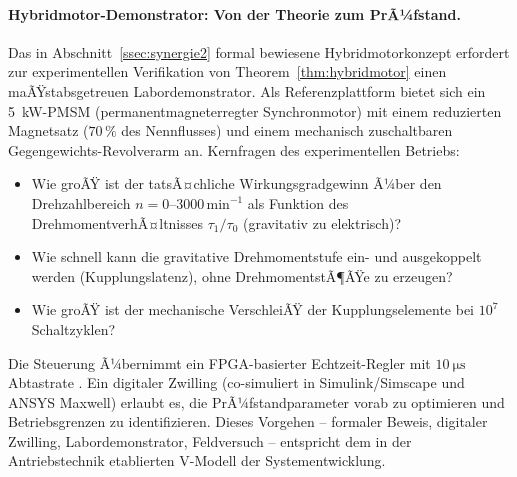 ﻿\documentclass[12pt, a4paper]{report}
\theoremstyle{definition}
\theoremstyle{remark}
\begin{document}
\paragraph{Hybridmotor-Demonstrator: Von der Theorie zum PrÃ¼fstand.}
Das in Abschnitt~\ref{ssec:synergie2} formal bewiesene Hybridmotorkonzept
erfordert zur experimentellen Verifikation von Theorem~\ref{thm:hybridmotor}
einen maÃŸstabsgetreuen Labordemonstrator. Als Referenzplattform bietet sich ein
\SI{5}{\kilo\watt}-PMSM (permanentmagneterregter Synchronmotor) mit einem
reduzierten Magnetsatz ($70\,\%$ des Nennflusses) und einem mechanisch
zuschaltbaren Gegengewichts-Revolverarm an. Kernfragen des experimentellen
Betriebs:
\begin{itemize}
  \item Wie groÃŸ ist der tatsÃ¤chliche Wirkungsgradgewinn Ã¼ber den Drehzahlbereich
        $n = 0$--$3000\,\text{min}^{-1}$ als Funktion des DrehmomentverhÃ¤ltnisses
        $\tau_1 / \tau_0$ (gravitativ zu elektrisch)?
  \item Wie schnell kann die gravitative Drehmomentstufe ein- und ausgekoppelt
        werden (Kupplungslatenz), ohne DrehmomentstÃ¶ÃŸe zu erzeugen?
  \item Wie groÃŸ ist der mechanische VerschleiÃŸ der Kupplungselemente bei
        $10^7$ Schaltzyklen?
\end{itemize}
Die Steuerung Ã¼bernimmt ein FPGA-basierter Echtzeit-Regler mit
$\SI{10}{\micro\second}$ Abtastrate \cite{bose2002}. Ein digitaler Zwilling
(co-simuliert in Simulink/Simscape und ANSYS Maxwell) erlaubt es, die
PrÃ¼fstandparameter vorab zu optimieren und Betriebsgrenzen zu identifizieren.
Dieses Vorgehen -- formaler Beweis, digitaler Zwilling, Labordemonstrator,
Feldversuch -- entspricht dem in der Antriebstechnik etablierten
V-Modell der Systementwicklung.
\end{document}
